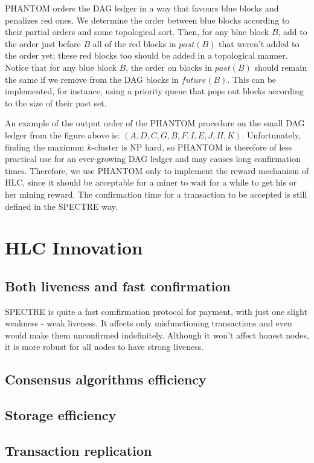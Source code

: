 \documentclass[a4paper,11pt]{article}
\begin{document}
PHANTOM orders the DAG ledger in a way that favours blue blocks and penalizes
red ones. We determine the order between blue blocks according to their partial
orders and some topological sort. Then, for any blue block $B$, add to the order
just before $B$ all of the red blocks in $past(B)$ that weren’t added to the
order yet; these red blocks too should be added in a topological manner. Notice
that for any blue block $B$, the order on blocks in $past(B)$ should remain the
same if we remove from the DAG blocks in $future(B)$. This can be implemented,
for instance, using a priority queue that pops out blocks according to the size
of their past set.

An example of the output order of the PHANTOM procedure on the small DAG ledger
from the figure above is: $(A,D,C,G,B,F,I,E,J,H,K)$. Unfortunately, finding the
maximum $k$-cluster is NP hard, so PHANTOM is therefore of less practical use
for an ever-growing DAG ledger and may causes long confirmation times.
Therefore, we use PHANTOM only to implement the reward mechanism of HLC, since
it should be acceptable for a miner to wait for a while to get his or her mining
reward. The confirmation time for a transaction to be accepted is still defined
in the SPECTRE way.

\section{HLC Innovation}
\subsection{Both liveness and fast confirmation} 
SPECTRE is quite a fast comfirmation protocol for payment, with just one slight weakness - weak liveness. It affects only misfunctioning transactions and even would make them unconfirmed indefinitely. Although it won't affect honest nodes, it is more robust for all nodes to have strong liveness.

\subsection{Consensus algorithms efficiency} 

\subsection{Storage efficiency} 

\subsection{Transaction replication} 
\end{document}
